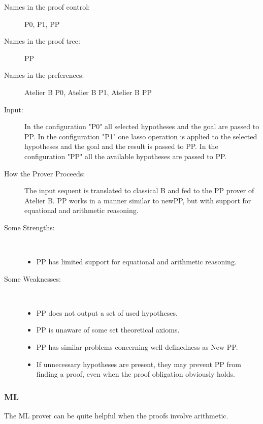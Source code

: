 \begin{description}
	\item[Names in the proof control:]  P0, P1, PP
	\item[Names in the proof tree:] PP
	\item[Names in the preferences:] Atelier B P0, Atelier B P1, Atelier B PP
	\item[Input:] In the configuration "P0" all selected hypotheses and the goal are passed to PP. In the configuration "P1" one lasso operation is applied to the selected hypotheses and the goal and the result is passed to PP. In the configuration "PP" all the available hypotheses are passed to PP.
	\item[How the Prover Proceeds:] The input sequent is translated to classical B and fed to the PP prover of Atelier B. PP works in a manner similar to newPP, but with support for equational and arithmetic reasoning.
	\item[Some Strengths:] ~
	\begin{itemize}
		\item PP has limited support for equational and arithmetic reasoning. 
	\end{itemize}
	\item[Some Weaknesses:] ~
\begin{itemize}
	\item PP does not output a set of used hypotheses.
	\item PP is unaware of some set theoretical axioms.
	\item PP has similar problems concerning well-definedness as New PP.
	\item If unnecessary hypotheses are present, they may prevent PP from finding a proof, even when the proof obligation obviously holds. 
\end{itemize}
\end{description}

\subsubsection{ML}

The ML prover can be quite helpful when the proofs involve arithmetic.

